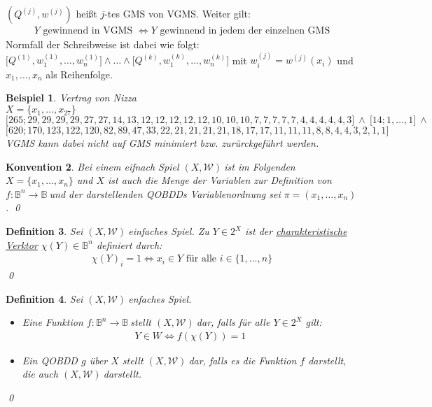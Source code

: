 \documentclass[ngerman]{scrartcl}
\theoremstyle{custom}
\newtheorem{mdef}{Definition} \numberwithin{mdef}{subsection}
\newtheorem{mex}[mdef]{Beispiel}
\newtheorem{mk}[mdef]{Konvention}
\newcommand{\0}{\mathbf{0}}
\newcommand{\1}{\mathbf{L}}
\newcommand{\bol}{\mathds{B}^n \rightarrow \mathds{B}}
\newcommand{\bolf}{$f: \bol~$}
\newcommand{\sg}{$(X,\mathcal{W})~$}
\begin{document}
$(Q^{(j)},w^{(j)})$ hei\ss t $j$-tes GMS von VGMS. Weiter gilt:
\begin{align*}
Y \text{ gewinnend in VGMS } \Leftrightarrow Y \text{ gewinnend in
  jedem der einzelnen GMS}
\end{align*}
Normfall der Schreibweise ist dabei wie folgt:\\
$\lbrack Q^{(1)},w^{(1)}_1,\dots, w^{(1)}_n \rbrack \wedge \dots
\wedge \lbrack Q^{(k)},w^{(k)}_1,\dots, w^{(k)}_n \rbrack$ mit
$w_i^{(j)}=w^{(j)}(x_i)$ und $x_1, \dots, x_n$ als Reihenfolge.

\begin{mex}\label{mex:415}
Vertrag von Nizza\\
$X = \{x_1, \dots, x_{27}\}$\\
$\lbrack 265; 29, 29, 29, 29, 27, 27, 14, 13, 12, 12, 12, 12, 12, 10,
10, 10, 7, 7, 7, 7, 7, 4, 4, 4, 4, 4, 3\rbrack ~\wedge~ \lbrack 14; 1,
\dots, 1 \rbrack ~\wedge$\\
$\lbrack 620; 170, 123, 122, 120, 82, 89, 47, 33, 22, 21, 21, 21, 21,
18, 17, 17, 11, 11, 11, 8, 8, 4, 4, 3, 2, 1, 1\rbrack$\\
VGMS kann dabei nicht auf GMS minimiert bzw. zur\"urckgef\"uhrt werden.
\end{mex}

\begin{mk}
Bei einem eifnach Spiel \sg ist im Folgenden $X = \{x_1, \dots, x_n\}$
und $X$ ist auch die Menge der Variablen zur Definition von \bolf und
der darstellenden QOBDDs Variablenordnung sei $\pi = (x_1, \dots, x_n)$.
\qed
\end{mk}

\begin{mdef}
Sei \sg einfaches Spiel. Zu $Y \in 2^X$ ist der
\underline{charakteristische Verktor} $\chi(Y) \in \mathds{B}^n$
definiert durch:
\begin{align*}
\chi(Y)_i =1 \Leftrightarrow x_i \in Y \text{ f\"ur alle } i \in \{1,
\dots, n\}
\end{align*}
\qed
\end{mdef}

\begin{mdef}
Sei \sg enfaches Spiel. 
\begin{itemize}
\item[(1)] Eine Funktion \bolf stellt \sg dar, falls f\"ur alle $Y \in
  2^X$ gilt:
\begin{align*}
Y \in W \Leftrightarrow f(\chi(Y)) = 1
\end{align*}
\item[(2)] Ein QOBDD $g$ \"uber $X$ stellt \sg dar, falls es die
  Funktion $f$ darstellt, die auch \sg darstellt.
\end{itemize}
\qed
\end{mdef}
\end{document}
